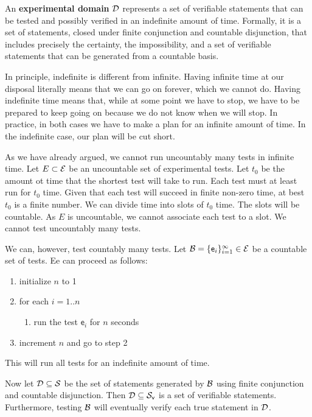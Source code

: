 \documentclass[11pt,letterpaper,fleqn]{memoir} %
\begin{document}
\begin{mathSection}
\begin{defn}
	An \textbf{experimental domain} $\mathcal{D}$ represents a set of verifiable statements that can be tested and possibly verified  in an indefinite amount of time. Formally, it is a set of statements, closed under finite conjunction and countable disjunction, that includes precisely the certainty, the impossibility, and a set of verifiable statements that can be generated from a countable basis.
\end{defn}
\begin{justification}
	In principle, indefinite is different from infinite. Having infinite time at our disposal literally means that we can go on forever, which we cannot do. Having indefinite time means that, while at some point we have to stop, we have to be prepared to keep going on because we do not know when we will stop. In practice, in both cases we have to make a plan for an infinite amount of time. In the indefinite case, our plan will be cut short.
	
	As we have already argued, we cannot run uncountably many tests in infinite time. Let $E \subset \mathcal{E}$ be an uncountable set of experimental tests. Let $t_0$ be the amount ot time that the shortest test will take to run. Each test must at least run for $t_0$ time. Given that each test will succeed in finite non-zero time, at best $t_0$ is a finite number. We can divide time into slots of $t_0$ time. The slots will be countable. As $E$ is uncountable, we cannot associate each test to a slot. We cannot test uncountably many tests.
	
	We can, however, test countably many tests. Let $\mathcal{B} = \{\mathsf{e}_i\}_{i=1}^{\infty} \in \mathcal{E}$ be a countable set of tests. Ee can proceed as follows:
	\begin{enumerate}
		\item initialize $n$ to 1
		\item for each $i=1..n$
		\begin{enumerate}
			\item run the test $\mathsf{e}_i$ for $n$ seconds
		\end{enumerate}
		\item increment $n$ and go to step 2
	\end{enumerate}	
	This will run all tests for an indefinite amount of time.
	
	Now let $\mathcal{D} \subseteq \mathcal{S}$ be the set of statements generated by $\mathcal{B}$ using finite conjunction and countable disjunction. Then $\mathcal{D} \subseteq \mathcal{S}_\textsf{v}$ is a set of verifiable statements. Furthermore, testing $\mathcal{B}$ will eventually verify each true statement in $\mathcal{D}$.
	

\end{justification}
\end{mathSection}
\end{document}
